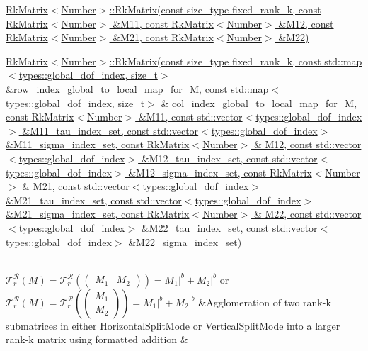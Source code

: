 \begin{longtabu}
\begin{DoxyItemize}
\item \hyperlink{classRkMatrix_acefd088fc714d99b701a553713c405ce}{Rk\+Matrix$<$\+Number$>$\+::\+Rk\+Matrix(const size\+\_\+type fixed\+\_\+rank\+\_\+k, const Rk\+Matrix$<$\+Number$>$ \&\+M11, const Rk\+Matrix$<$\+Number$>$ \&\+M12, const Rk\+Matrix$<$\+Number$>$ \&\+M21, const Rk\+Matrix$<$\+Number$>$ \&\+M22)}
\item \hyperlink{classRkMatrix_a08f64aa2d91226f2d4e4f84911be5079}{Rk\+Matrix$<$\+Number$>$\+::\+Rk\+Matrix(const size\+\_\+type fixed\+\_\+rank\+\_\+k, const std\+::map$<$types\+::global\+\_\+dof\+\_\+index, size\+\_\+t$>$ \&row\+\_\+index\+\_\+global\+\_\+to\+\_\+local\+\_\+map\+\_\+for\+\_\+\+M, const std\+::map$<$types\+::global\+\_\+dof\+\_\+index, size\+\_\+t$>$ \& col\+\_\+index\+\_\+global\+\_\+to\+\_\+local\+\_\+map\+\_\+for\+\_\+\+M, const Rk\+Matrix$<$\+Number$>$ \&\+M11, const std\+::vector$<$types\+::global\+\_\+dof\+\_\+index$>$ \&\+M11\+\_\+tau\+\_\+index\+\_\+set, const std\+::vector$<$types\+::global\+\_\+dof\+\_\+index$>$ \&\+M11\+\_\+sigma\+\_\+index\+\_\+set, const Rk\+Matrix$<$\+Number$>$ \& M12, const std\+::vector$<$types\+::global\+\_\+dof\+\_\+index$>$ \&\+M12\+\_\+tau\+\_\+index\+\_\+set, const std\+::vector$<$types\+::global\+\_\+dof\+\_\+index$>$ \&\+M12\+\_\+sigma\+\_\+index\+\_\+set, const Rk\+Matrix$<$\+Number$>$ \& M21, const std\+::vector$<$types\+::global\+\_\+dof\+\_\+index$>$ \&\+M21\+\_\+tau\+\_\+index\+\_\+set, const std\+::vector$<$types\+::global\+\_\+dof\+\_\+index$>$ \&\+M21\+\_\+sigma\+\_\+index\+\_\+set, const Rk\+Matrix$<$\+Number$>$ \& M22, const std\+::vector$<$types\+::global\+\_\+dof\+\_\+index$>$ \&\+M22\+\_\+tau\+\_\+index\+\_\+set, const std\+::vector$<$types\+::global\+\_\+dof\+\_\+index$>$ \&\+M22\+\_\+sigma\+\_\+index\+\_\+set)}
\end{DoxyItemize}\\
$\mathcal{T}_r^{\mathcal{R}}(M) = \mathcal{T}_r^{\mathcal{R}}\left(\begin{pmatrix} M_1 & M_2 \end{pmatrix}\right) = M_1 \vert^b + M_2 \vert^b$ or $\mathcal{T}_r^{\mathcal{R}}(M) = \mathcal{T}_r^{\mathcal{R}}\left(\begin{pmatrix} M_1 \\ M_2 \end{pmatrix}\right) = M_1 \vert^b + M_2 \vert^b$ &Agglomeration of two rank-\/k submatrices in either {\ttfamily Horizontal\+Split\+Mode} or {\ttfamily Vertical\+Split\+Mode} into a larger rank-\/k matrix using formatted addition &

\end{longtabu}

